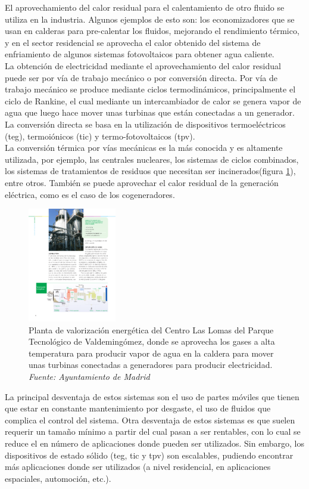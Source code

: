 El aprovechamiento del calor residual para el calentamiento de otro fluido se utiliza en la industria. Algunos ejemplos de esto son: los economizadores que se usan en calderas para pre-calentar los fluidos, mejorando el rendimiento térmico, y en el sector residencial se aprovecha el calor obtenido del sistema de enfriamiento de algunos sistemas fotovoltaicos para obtener agua caliente.\\ 

La obtención de electricidad mediante el aprovechamiento del calor residual puede ser por vía de trabajo mecánico o por conversión directa. Por vía de trabajo mecánico se produce mediante ciclos termodinámicos, principalmente el ciclo de Rankine, el cual mediante un intercambiador de calor se genera vapor de agua que luego hace mover unas turbinas que están conectadas a un generador. La conversión directa se basa en la utilización de dispositivos termoeléctricos (\acrshort{teg}), termoiónicos (\acrshort{tic}) y termo-fotovoltaicos (\acrshort{tpv}).\\

La conversión térmica por vías mecánicas es la más conocida y es altamente utilizada, por ejemplo, las centrales nucleares, los sistemas de ciclos combinados, los sistemas de tratamientos de residuos que necesitan ser incinerados(figura \ref{fig:esquemaslomasvalorizacion}), entre otros. También se puede aprovechar el calor residual de la generación eléctrica, como es el caso de los cogeneradores.

\begin{figure}[H]
	\centering
	\includegraphics[height=5cm]{figuras/esquemasLomasValorizacion}
	\caption{Planta de valorización energética del Centro Las Lomas del Parque Tecnológico de Valdemingómez, donde se aprovecha los gases a alta temperatura para producir vapor de agua en la caldera para mover unas turbinas conectadas a generadores para producir electricidad. \textit{Fuente: Ayuntamiento de Madrid}}
	\label{fig:esquemaslomasvalorizacion}
\end{figure}
La principal desventaja de estos sistemas son el uso de partes móviles que tienen que estar en constante mantenimiento por desgaste, el uso de fluidos que complica el control del sistema. Otra desventaja de estos sistemas es que suelen requerir un tamaño mínimo a partir del cual pasan a ser rentables, con lo cual se reduce el en número de aplicaciones donde pueden ser utilizados. Sin embargo, los dispositivos de estado sólido (\acrshort{teg}, \acrshort{tic} y \acrshort{tpv}) son escalables, pudiendo encontrar más aplicaciones donde ser utilizados (a nivel residencial, en aplicaciones espaciales, automoción, etc.).\\

